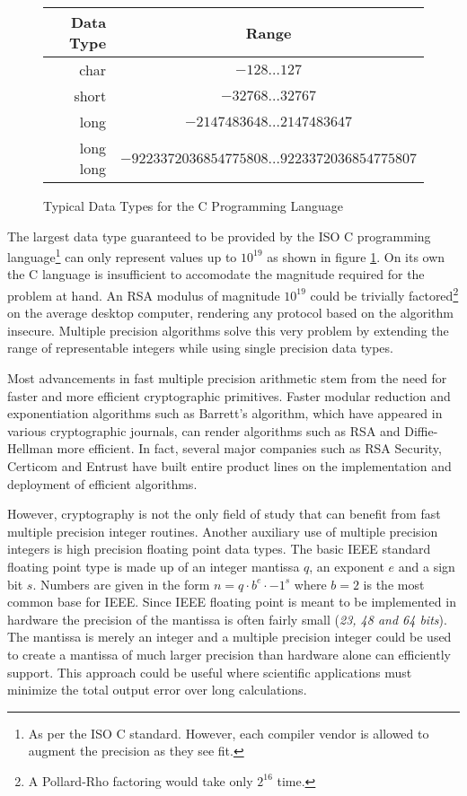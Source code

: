 \documentclass[b5paper]{book}
\begin{document}
\begin{figure}[!here]
\begin{center}
\begin{tabular}{|r|c|}
\hline \textbf{Data Type} & \textbf{Range} \\
\hline char  & $-128 \ldots 127$ \\
\hline short & $-32768 \ldots 32767$ \\
\hline long  & $-2147483648 \ldots 2147483647$ \\
\hline long long & $-9223372036854775808 \ldots 9223372036854775807$ \\
\hline
\end{tabular}
\end{center}
\caption{Typical Data Types for the C Programming Language}
\label{fig:ISOC}
\end{figure}

The largest data type guaranteed to be provided by the ISO C programming 
language\footnote{As per the ISO C standard.  However, each compiler vendor is allowed to augment the precision as they 
see fit.}  can only represent values up to $10^{19}$ as shown in figure \ref{fig:ISOC}. On its own the C language is 
insufficient to accomodate the magnitude required for the problem at hand.  An RSA modulus of magnitude $10^{19}$ could be 
trivially factored\footnote{A Pollard-Rho factoring would take only $2^{16}$ time.} on the average desktop computer, 
rendering any protocol based on the algorithm insecure.  Multiple precision algorithms solve this very problem by 
extending the range of representable integers while using single precision data types.

Most advancements in fast multiple precision arithmetic stem from the need for faster and more efficient cryptographic 
primitives.  Faster modular reduction and exponentiation algorithms such as Barrett's algorithm, which have appeared in 
various cryptographic journals, can render algorithms such as RSA and Diffie-Hellman more efficient.  In fact, several 
major companies such as RSA Security, Certicom and Entrust have built entire product lines on the implementation and 
deployment of efficient algorithms.

However, cryptography is not the only field of study that can benefit from fast multiple precision integer routines.  
Another auxiliary use of multiple precision integers is high precision floating point data types.  
The basic IEEE \cite{IEEE} standard floating point type is made up of an integer mantissa $q$, an exponent $e$ and a sign bit $s$.  
Numbers are given in the form $n = q \cdot b^e \cdot -1^s$ where $b = 2$ is the most common base for IEEE.  Since IEEE 
floating point is meant to be implemented in hardware the precision of the mantissa is often fairly small 
(\textit{23, 48 and 64 bits}).  The mantissa is merely an integer and a multiple precision integer could be used to create
a mantissa of much larger precision than hardware alone can efficiently support.  This approach could be useful where 
scientific applications must minimize the total output error over long calculations.
\end{document}
